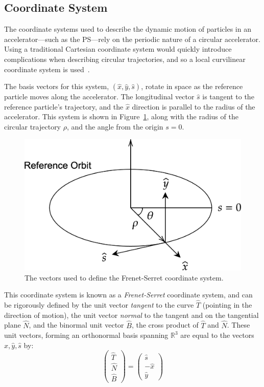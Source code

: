 \documentclass[a4paper,twoside,11pt]{report}
\begin{document}
\subsection{Coordinate System}

The coordinate systems used to describe the dynamic motion of particles in an accelerator---such as the PS---rely on the periodic nature of a circular accelerator. Using a traditional Cartesian coordinate system would quickly introduce complications when describing circular trajectories, and so a local curvilinear coordinate system is used~\cite{BDSIM}.

The basis vectors for this system, $(\hat x, \hat y, \hat s)$, rotate in space as the reference particle moves along the accelerator. The longitudinal vector $\hat s$ is tangent to the reference particle's trajectory, and the $\hat x$ direction is parallel to the radius of the accelerator.  This system is shown in Figure~\ref{fig:frenet-serret}, along with the radius of the circular trajectory $\rho$, and the angle from the origin $s=0$. 

\begin{figure}[!h]
  \centering
  \includegraphics*[width=0.5\linewidth]{coordinate-system.png}
  \caption[Local coordinate system]{The vectors used to define the Frenet-Serret coordinate system.}\label{fig:frenet-serret}
\end{figure}

This coordinate system is known as a {\it Frenet-Serret} coordinate system, and can be rigorously defined by the unit vector {\it tangent} to the curve $\hat T$ (pointing in the direction of motion), the unit vector {\it normal} to the tangent and on the tangential plane $\hat N$, and the binormal unit vector $\hat B$, the cross product of $\hat T$ and $\hat N$. These unit vectors, forming an orthonormal basis spanning $\mathbb{R}^3$ are equal to the vectors $\hat x, \hat y, \hat s$ by:
\begin{equation}
\begin{pmatrix}\hat T\\\hat N\\\hat B \end{pmatrix}=\begin{pmatrix}\hat s\\-\hat x\\\hat y \end{pmatrix}
\end{equation}
\end{document}
